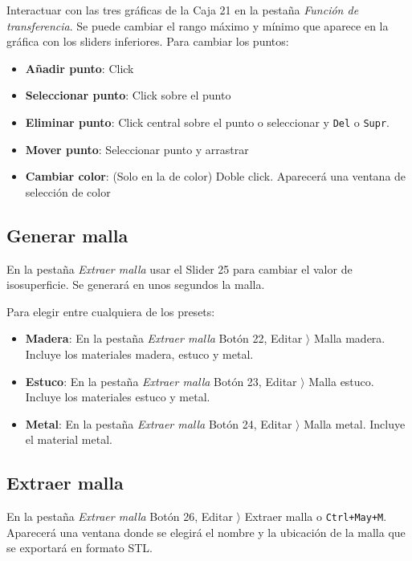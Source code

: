 Interactuar con las tres gráficas de la Caja 21 en la pestaña \textit{Función de transferencia}. Se puede cambiar el rango máximo y mínimo que aparece en la gráfica con los sliders inferiores. Para cambiar los puntos: 

\begin{itemize}
	\item \textbf{Añadir punto}: Click
	\item \textbf{Seleccionar punto}: Click sobre el punto
	\item \textbf{Eliminar punto}: Click central sobre el punto o seleccionar y \texttt{Del} o \texttt{Supr}.
	\item \textbf{Mover punto}: Seleccionar punto y arrastrar
	\item \textbf{Cambiar color}: (Solo en la de color) Doble click. Aparecerá una ventana de selección de color
\end{itemize}

\subsection{Generar malla}

En la pestaña \textit{Extraer malla} usar el Slider 25 para cambiar el valor de isosuperficie. Se generará en unos segundos la malla.

Para elegir entre cualquiera de los presets:

\begin{itemize}
	\item \textbf{Madera}: En la pestaña \textit{Extraer malla} Botón 22, Editar $ \rangle $ Malla madera. Incluye los materiales madera, estuco y metal.
	\item \textbf{Estuco}: En la pestaña \textit{Extraer malla} Botón 23, Editar $ \rangle $ Malla estuco. Incluye los materiales estuco y metal.
	\item \textbf{Metal}: En la pestaña \textit{Extraer malla} Botón 24, Editar $ \rangle $ Malla metal. Incluye el material metal.
\end{itemize}

\subsection{Extraer malla}

En la pestaña \textit{Extraer malla} Botón 26, Editar $ \rangle $ Extraer malla o \texttt{Ctrl+May+M}. Aparecerá una ventana donde se elegirá el nombre y la ubicación de la malla que se exportará en formato STL.

